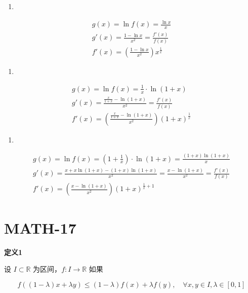 \begin{enumerate}
\def\labelenumi{\arabic{enumi}.}
\tightlist
\item
\end{enumerate}

\[
\begin{aligned}
g(x)=\ln f(x)=\frac{\ln x}{x}\\
g'(x)=\frac{1-\ln x}{x^{2}}=\frac{f'(x)}{f(x)}\\
f'(x)=\left( \frac{1-\ln x}{x^{2}} \right)x^{\frac{1}{x}}
\end{aligned}
\]

\begin{enumerate}
\def\labelenumi{\arabic{enumi}.}
\setcounter{enumi}{1}
\tightlist
\item
\end{enumerate}

\[
\begin{aligned}
g(x) = \ln f(x) = \frac{1}{x} \cdot \ln (1+x)\\
g'(x) = \frac{\frac{x}{1+x}-\ln(1+x)}{x^{2}} = \frac{f'(x)}{f(x)}\\
f'(x)=\left( \frac{\frac{x}{1+x}-\ln(1+x)}{x^{2}} \right)(1+x)^{\frac{1}{x}}
\end{aligned}
\]

\begin{enumerate}
\def\labelenumi{\arabic{enumi}.}
\setcounter{enumi}{2}
\tightlist
\item
\end{enumerate}

\[
\begin{aligned}
g(x) = \ln f(x) =\left(1+\frac{1}{x} \right) \cdot \ln (1+x) = \frac{(1+x)\ln(1+x) }{x}\\
g'(x) = \frac{x+x\ln(1+x)-(1+x)\ln(1+x)}{x^{2}}=\frac{x-\ln(1+x)}{x^{2}}=\frac{f'(x)}{f(x)}\\
f'(x)=\left( \frac{x-\ln(1+x)}{x^{2}} \right)(1+x)^{\frac{1}{x}+1}
\end{aligned}
\]

\section{MATH-17}\label{math-17}

\textbf{定义1}

设 \(I \subset \mathbb{ R}\) 为区间，\(f:I\to \mathbb{R}\) 如果

\[
f((1-\lambda)x+\lambda y)\leq(1-\lambda) f(x)+\lambda f(y), \quad \forall x,y\in I, \lambda \in [0,1]
\]

